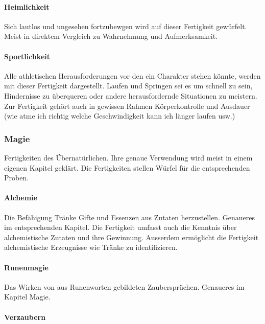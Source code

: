 \documentclass{article}
\begin{document}
\paragraph{Heimlichkeit}

Sich lautlos und ungesehen fortzubewgen wird auf dieser Fertigkeit gewürfelt. Meist in direktem Vergleich zu
Wahrnehmung und Aufmerksamkeit.

\paragraph{Sportlichkeit}

Alle athletischen Herausforderungen vor den ein Charakter stehen könnte, werden mit dieser Fertigkeit dargestellt.
Laufen und Springen sei es um schnell zu sein, Hindernisse zu überqueren oder andere herausfordernde Situationen zu
meistern. Zur Fertigkeit gehört auch in gewissen Rahmen Körperkontrolle und Ausdauer (wie atme ich richtig welche
Geschwindigkeit kann ich länger laufen usw.)

\subsubsection{Magie}

Fertigkeiten des Übernatürlichen. Ihre genaue Verwendung wird meist in einem eigenen Kapitel geklärt. Die
Fertigkeiten stellen Würfel für die entsprechenden Proben.

\paragraph{Alchemie}

Die Befähigung Tränke Gifte und Essenzen aus Zutaten herzustellen. Genaueres im entsprechenden Kapitel. Die Fertigkeit
umfasst auch die Kenntnis über alchemistische Zutaten und ihre Gewinnung. Ausserdem ermöglicht die Fertigkeit
alchemistische Erzeugnisse wie Tränke zu identifizieren.

\paragraph{Runenmagie}

Das Wirken von aus Runenworten gebildeten Zaubersprüchen. Genaueres im Kapitel Magie.

\paragraph{Verzaubern}
\end{document}
